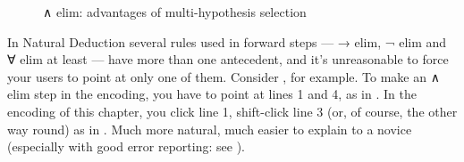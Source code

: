 \begin{figure}
\caption{∧ elim: advantages of multi-hypothesis selection}
\label{fig:I2L:andelimbox1}
\end{figure}

In Natural Deduction several rules used in forward steps --- → elim, ¬ elim and ∀ elim at least --- have more than one antecedent, and it's unreasonable to force your users to point at only one of them. Consider , for example. To make an ∧ elim step in the  encoding, you have to point at lines 1 and 4, as in . In the  encoding of this chapter, you click line 1, shift-click line 3 (or, of course, the other way round) as in . Much more natural, much easier to explain to a novice (especially with good error reporting: see ). 

